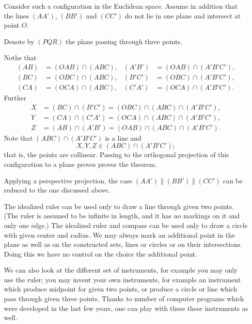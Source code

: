 {
Consider such a configuration in the Euclidean space.
Assume in addition that the lines $(AA')$, $(BB')$ and $(CC')$ do not lie in one plane and intersect at point $O$.

Denote by $(PQR)$ the plane passing through three points.

Nothe that
\begin{align*}
(AB)&= (OAB)\cap (ABC),&
(A'B')&= (OAB)\cap (A'B'C'),\\
(BC)&= (OBC)\cap (ABC),&
(B'C')&= (OBC)\cap (A'B'C'),\\
(CA)&= (OCA)\cap (ABC),&
(C'A')&= (OCA)\cap (A'B'C').
\end{align*}
Further
\begin{align*}
X&=(BC)\cap(B'C')=(OBC)\cap (ABC)\cap (A'B'C'),\\
Y&=(CA)\cap(C'A')=(OCA)\cap (ABC)\cap (A'B'C'),\\
Z&=(AB)\cap(A'B')=(OAB)\cap (ABC)\cap (A'B'C').
\end{align*}
Note that $(ABC)\cap (A'B'C')$ is a line and
\[X,Y,Z\in (ABC)\cap (A'B'C');\]
that is, the points are collinear. 
Passing  to the orthogonal projection of this configuration to a plane proves proves the theorem.

Applying a perspective projection,
the case $(AA')\parallel(BB')\parallel(CC')$ 
can be reduced to the one discussed above.
\qeds

















The idealized ruler can be used only to draw a line through given two points. (The ruler is assumed to be infinite in length, and it has no markings on it and only one edge.)
The idealized ruler and compass can be used only to draw a circle with given center and radius.
We may always mark an additional point in the plane
as well as on the constructed sets, lines or circles or on their intersections.
Doing this we have no control on the choice the additional point. 

We can also look at the different set of instruments, 
for example
you may only use the ruler;
you may invent your own instruments, for example an instrument which produce midpoint for given two points, 
or produce a circle or line which pass through given three points.
Thanks to number of computer programs which were developed in the last few years, one can play with these these instruments as well.

}

